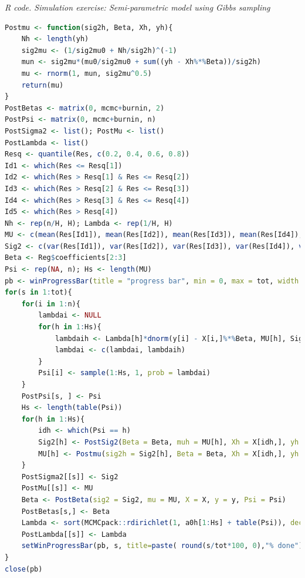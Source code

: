 \begin{tcolorbox}[enhanced,width=4.67in,center upper,
	fontupper=\large\bfseries,drop shadow southwest,sharp corners]
	\textit{R code. Simulation exercise: Semi-parametric model using Gibbs sampling}
	\begin{VF}
		\begin{lstlisting}[language=R]
Postmu <- function(sig2h, Beta, Xh, yh){
	Nh <- length(yh)
	sig2mu <- (1/sig2mu0 + Nh/sig2h)^(-1)
	mun <- sig2mu*(mu0/sig2mu0 + sum((yh - Xh%*%Beta))/sig2h)
	mu <- rnorm(1, mun, sig2mu^0.5)
	return(mu)
}
PostBetas <- matrix(0, mcmc+burnin, 2)
PostPsi <- matrix(0, mcmc+burnin, n)
PostSigma2 <- list(); PostMu <- list()
PostLambda <- list()
Resq <- quantile(Res, c(0.2, 0.4, 0.6, 0.8))
Id1 <- which(Res <= Resq[1])
Id2 <- which(Res > Resq[1] & Res <= Resq[2])
Id3 <- which(Res > Resq[2] & Res <= Resq[3])
Id4 <- which(Res > Resq[3] & Res <= Resq[4])
Id5 <- which(Res > Resq[4])
Nh <- rep(n/H, H); Lambda <- rep(1/H, H)
MU <- c(mean(Res[Id1]), mean(Res[Id2]), mean(Res[Id3]), mean(Res[Id4]), mean(Res[Id5]))
Sig2 <- c(var(Res[Id1]), var(Res[Id2]), var(Res[Id3]), var(Res[Id4]), var(Res[Id5]))
Beta <- Reg$coefficients[2:3]
Psi <- rep(NA, n); Hs <- length(MU)
pb <- winProgressBar(title = "progress bar", min = 0, max = tot, width = 300)
for(s in 1:tot){
	for(i in 1:n){
		lambdai <- NULL
		for(h in 1:Hs){
			lambdaih <- Lambda[h]*dnorm(y[i] - X[i,]%*%Beta, MU[h], Sig2[h]^0.5)
			lambdai <- c(lambdai, lambdaih)
		}
		Psi[i] <- sample(1:Hs, 1, prob = lambdai)
	}
	PostPsi[s, ] <- Psi
	Hs <- length(table(Psi))
	for(h in 1:Hs){
		idh <- which(Psi == h)
		Sig2[h] <- PostSig2(Beta = Beta, muh = MU[h], Xh = X[idh,], yh = y[idh])
		MU[h] <- Postmu(sig2h = Sig2[h], Beta = Beta, Xh = X[idh,], yh = y[idh])
	}
	PostSigma2[[s]] <- Sig2
	PostMu[[s]] <- MU 
	Beta <- PostBeta(sig2 = Sig2, mu = MU, X = X, y = y, Psi = Psi)
	PostBetas[s,] <- Beta
	Lambda <- sort(MCMCpack::rdirichlet(1, a0h[1:Hs] + table(Psi)), decreasing = TRUE)
	PostLambda[[s]] <- Lambda
	setWinProgressBar(pb, s, title=paste( round(s/tot*100, 0),"% done"))
}
close(pb)
\end{lstlisting}
	\end{VF}
\end{tcolorbox}

